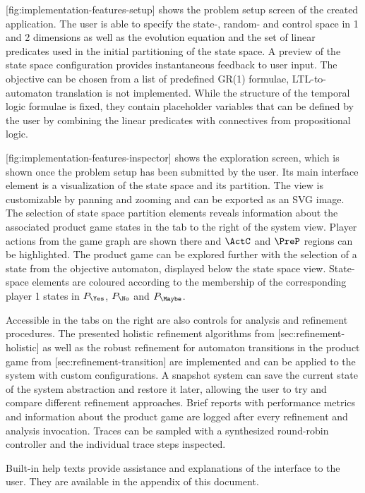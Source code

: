 

[fig:implementation-features-setup] shows the problem setup screen of the created application.
The user is able to specify the state-, random- and control space in 1 and 2 dimensions as well as the evolution equation and the set of linear predicates used in the initial partitioning of the state space.
A preview of the state space configuration provides instantaneous feedback to user input.
The objective can be chosen from a list of predefined GR(1) formulae, LTL-to-automaton translation is not implemented.
While the structure of the temporal logic formulae is fixed, they contain placeholder variables that can be defined by the user by combining the linear predicates with connectives from propositional logic.

[fig:implementation-features-inspector] shows the exploration screen, which is shown once the problem setup has been submitted by the user.
Its main interface element is a visualization of the state space and its partition.
The view is customizable by panning and zooming and can be exported as an SVG image.
The selection of state space partition elements reveals information about the associated product game states in the  tab to the right of the system view.
Player actions from the game graph are shown there and $\ActC$ and $\PreP$ regions can be highlighted.
The product game can be explored further with the selection of a state from the objective automaton, displayed below the state space view.
State-space elements are coloured according to the membership of the corresponding player 1 states in $P_\Yes$, $P_\No$ and $P_\Maybe$.

Accessible in the tabs on the right are also controls for analysis and refinement procedures.
The presented holistic refinement algorithms from [sec:refinement-holistic] as well as the robust refinement for automaton transitions in the product game from [sec:refinement-transition] are implemented and can be applied to the system with custom configurations.
A snapshot system can save the current state of the system abstraction and restore it later, allowing the user to try and compare different refinement approaches.
Brief reports with performance metrics and information about the product game are logged after every refinement and analysis invocation.
Traces can be sampled with a synthesized round-robin controller and the individual trace steps inspected.

Built-in help texts provide assistance and explanations of the interface to the user.
They are available in the appendix of this document.

